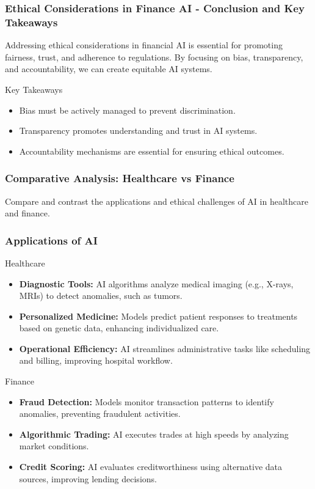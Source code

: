 \documentclass[aspectratio=169]{beamer}
\begin{document}
\begin{frame}[fragile]
    \frametitle{Ethical Considerations in Finance AI - Conclusion and Key Takeaways}
    Addressing ethical considerations in financial AI is essential for promoting fairness, trust, and adherence to regulations. By focusing on bias, transparency, and accountability, we can create equitable AI systems.
    
    \begin{block}{Key Takeaways}
        \begin{itemize}
            \item Bias must be actively managed to prevent discrimination.
            \item Transparency promotes understanding and trust in AI systems.
            \item Accountability mechanisms are essential for ensuring ethical outcomes.
        \end{itemize}
    \end{block}
\end{frame}

\begin{frame}[fragile]
    \frametitle{Comparative Analysis: Healthcare vs Finance}
    Compare and contrast the applications and ethical challenges of AI in healthcare and finance.
\end{frame}

\begin{frame}[fragile]
    \frametitle{Applications of AI}
    \begin{block}{Healthcare}
        \begin{itemize}
            \item \textbf{Diagnostic Tools:} AI algorithms analyze medical imaging (e.g., X-rays, MRIs) to detect anomalies, such as tumors. 
            \item \textbf{Personalized Medicine:} Models predict patient responses to treatments based on genetic data, enhancing individualized care.
            \item \textbf{Operational Efficiency:} AI streamlines administrative tasks like scheduling and billing, improving hospital workflow.
        \end{itemize}
    \end{block}
    
    \begin{block}{Finance}
        \begin{itemize}
            \item \textbf{Fraud Detection:} Models monitor transaction patterns to identify anomalies, preventing fraudulent activities.
            \item \textbf{Algorithmic Trading:} AI executes trades at high speeds by analyzing market conditions.
            \item \textbf{Credit Scoring:} AI evaluates creditworthiness using alternative data sources, improving lending decisions.
        \end{itemize}
    \end{block}
\end{frame}
\end{document}
